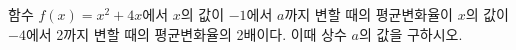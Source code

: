 함수 $f(x)=x^2+4x$에서 $x$의 값이 $-1$에서 $a$까지 변할 때의 평균변화율이 $x$의 값이 $-4$에서 2까지 변할 때의 평균변화율의 2배이다. 이때 상수 $a$의 값을 구하시오. 
